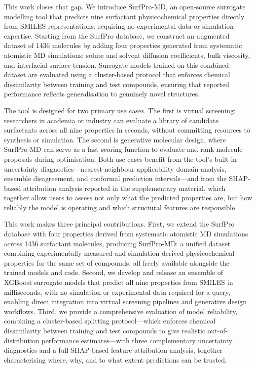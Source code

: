 \documentclass[11pt]{aime}
\begin{document}
This work closes that gap.
We introduce SurfPro-MD, an open-source surrogate modelling tool that predicts nine surfactant physicochemical properties directly from SMILES representations, requiring no experimental data or simulation expertise.
Starting from the SurfPro database\cite{hodl_surfpro_2025}, we construct an augmented dataset of 1436 molecules by adding four properties generated from systematic atomistic MD simulations: solute and solvent diffusion coefficients, bulk viscosity, and interfacial surface tension.
Surrogate models trained on this combined dataset are evaluated using a cluster-based protocol that enforces chemical dissimilarity between training and test compounds, ensuring that reported performance reflects generalisation to genuinely novel structures.

The tool is designed for two primary use cases.
The first is virtual screening: researchers in academia or industry can evaluate a library of candidate surfactants across all nine properties in seconds, without committing resources to synthesis or simulation.
The second is generative molecular design, where SurfPro-MD can serve as a fast scoring function to evaluate and rank molecule proposals during optimisation.
Both use cases benefit from the tool's built-in uncertainty diagnostics---nearest-neighbour applicability domain analysis, ensemble disagreement, and conformal prediction intervals---and from the SHAP-based attribution analysis reported in the supplementary material, which together allow users to assess not only what the predicted properties are, but how reliably the model is operating and which structural features are responsible.

This work makes three principal contributions.
First, we extend the SurfPro database\cite{hodl_surfpro_2025} with four properties derived from systematic atomistic MD simulations across 1436 surfactant molecules, producing SurfPro-MD: a unified dataset combining experimentally measured and simulation-derived physicochemical properties for the same set of compounds, all freely available alongside the trained models and code.
Second, we develop and release an ensemble of XGBoost surrogate models that predict all nine properties from SMILES in milliseconds, with no simulation or experimental data required for a query, enabling direct integration into virtual screening pipelines and generative design workflows.
Third, we provide a comprehensive evaluation of model reliability, combining a cluster-based splitting protocol---which enforces chemical dissimilarity between training and test compounds to give realistic out-of-distribution performance estimates---with three complementary uncertainty diagnostics and a full SHAP-based feature attribution analysis, together characterising where, why, and to what extent predictions can be trusted.
\end{document}
